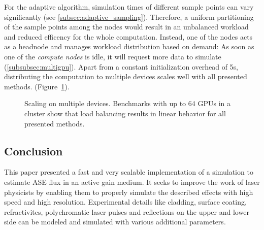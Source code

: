 For the adaptive algorithm, simulation times of different sample
points can vary significantly (see
\cref{subsec:adaptive_sampling}). Therefore, a uniform partitioning of
the sample points among the nodes would result in an unbalanced
workload and reduced efficency for the whole computation. Instead, one
of the nodes acts as a headnode and manages workload distribution
based on demand: As soon as one of the \emph{compute nodes} is idle,
it will request more data to simulate (\cref{subsubsec:multigpu}).
Apart from a constant initialization overhead of 5s, distributing the
computation to multiple devices scales well with all presented
methods. (Figure~\ref{plot:gpu_scaling}).
\begin{figure}[H]
  \centerline{
    }
  \caption{Scaling on multiple devices. Benchmarks with up to 64 GPUs
    in a cluster show that load balancing results in linear behavior for all
    presented methods.}
\label{plot:gpu_scaling}
\end{figure}

\subsection{Conclusion}
\label{subsec:conclusion}
This paper presented a fast and very scalable implementation of a simulation to
estimate ASE flux in an active gain medium. It seeks to improve the work of
laser physicists by enabling them to properly simulate the described effects
with high speed and high resolution. Experimental details like cladding, surface
coating, refractivites, polychromatic laser pulses and reflections on the upper
and lower side can be modeled and simulated with various additional parameters.

